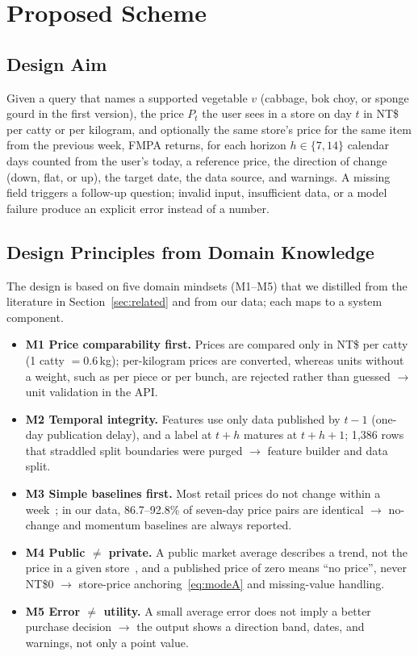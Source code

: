 \section{Proposed Scheme}\label{sec:method}

\subsection{Design Aim}
Given a query that names a supported vegetable $v$ (cabbage, bok choy, or
sponge gourd in the first version), the price $P_t$ the user sees in a store on
day $t$ in NT\$ per catty or per kilogram, and optionally the same store's
price for the same item from the previous week, FMPA returns, for each horizon
$h\in\{7,14\}$ calendar days counted from the user's today, a reference price,
the direction of change (down, flat, or up), the target date, the data source,
and warnings. A missing field triggers a follow-up question; invalid input,
insufficient data, or a model failure produce an explicit error instead of a
number.

\subsection{Design Principles from Domain Knowledge}
The design is based on five domain mindsets (M1--M5) that we distilled from
the literature in Section~\ref{sec:related} and from our data; each maps to a
system component.
\begin{itemize}
\item \textbf{M1 Price comparability first.} Prices are compared only in NT\$
per catty (1 catty $=0.6$\,kg); per-kilogram prices are converted, whereas
units without a weight, such as per piece or per bunch, are rejected rather
than guessed $\rightarrow$ unit validation in the API.
\item \textbf{M2 Temporal integrity.} Features use only data published by
$t-1$ (one-day publication delay), and a label at $t+h$ matures at $t+h+1$;
1{,}386 rows that straddled split boundaries were purged $\rightarrow$
feature builder and data split.
\item \textbf{M3 Simple baselines first.} Most retail prices do not change
within a week~\cite{nakamura2008five}; in our data, 86.7--92.8\% of seven-day
price pairs are identical $\rightarrow$ no-change and momentum baselines are
always reported.
\item \textbf{M4 Public $\neq$ private.} A public market average describes a
trend, not the price in a given store~\cite{meyer2004asymmetric}, and a
published price of zero means ``no price'', never NT\$0 $\rightarrow$
store-price anchoring~\eqref{eq:modeA} and missing-value handling.
\item \textbf{M5 Error $\neq$ utility.} A small average error does not imply a
better purchase decision $\rightarrow$ the output shows a direction band,
dates, and warnings, not only a point value.
\end{itemize}


